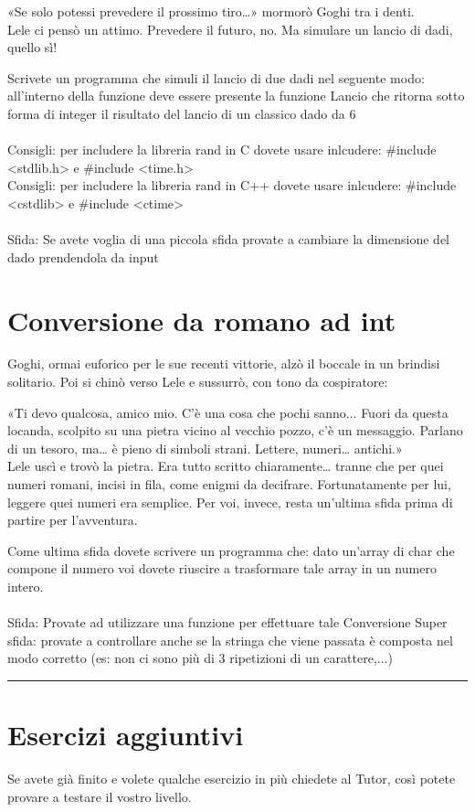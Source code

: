 \documentclass[a4paper]{article}
\begin{document}
«Se solo potessi prevedere il prossimo tiro…» mormorò Goghi tra i denti.\\
Lele ci pensò un attimo. Prevedere il futuro, no. Ma simulare un lancio di dadi, quello sì!

Scrivete un programma che simuli il lancio di due dadi nel seguente modo: all'interno della funzione deve essere presente la funzione Lancio che ritorna sotto forma di integer il risultato del lancio di un classico dado da 6\\
\\
Consigli: per includere la libreria rand in C dovete usare inlcudere: \#include <stdlib.h> e \#include <time.h>\\
Consigli: per includere la libreria rand in C++ dovete usare inlcudere: \#include <cstdlib> e \#include <ctime>\\
\\
Sfida: Se avete voglia di una piccola sfida provate a cambiare la dimensione del dado prendendola da input

\section*{Conversione da romano ad int}
Goghi, ormai euforico per le sue recenti vittorie, alzò il boccale in un brindisi solitario. Poi si chinò verso Lele e sussurrò, con tono da cospiratore:

«Ti devo qualcosa, amico mio. C’è una cosa che pochi sanno... Fuori da questa locanda, scolpito su una pietra vicino al vecchio pozzo, c’è un messaggio. Parlano di un tesoro, ma… è pieno di simboli strani. Lettere, numeri… antichi.»\\
Lele uscì e trovò la pietra. Era tutto scritto chiaramente… tranne che per quei numeri romani, incisi in fila, come enigmi da decifrare.
Fortunatamente per lui, leggere quei numeri era semplice. Per voi, invece, resta un’ultima sfida prima di partire per l’avventura.

Come ultima sfida dovete scrivere un programma che: dato un'array di char che compone il numero voi dovete riuscire a trasformare tale array in un numero intero.\\
\\
Sfida: Provate ad utilizzare una funzione per effettuare tale Conversione
Super sfida: provate a controllare anche se la stringa che viene passata è composta nel modo corretto (es: non ci sono più di 3 ripetizioni di un carattere,...)

\noindent\rule{\linewidth}{0.4pt}
\section*{Esercizi aggiuntivi}
Se avete già finito e volete qualche esercizio in più chiedete al Tutor, così potete provare a testare il vostro livello.
\end{document}
